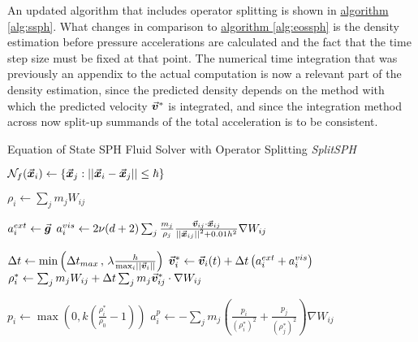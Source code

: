 An updated algorithm that includes operator splitting is shown in \hyperref[alg:ssph]{algorithm \ref{alg:ssph}}. What changes in comparison to \hyperref[alg:eossph]{algorithm \ref{alg:eossph}} is the density estimation before pressure accelerations are calculated and the fact that the time step size must be fixed at that point. The numerical time integration that was previously an appendix to the actual computation is now a relevant part of the density estimation, since the predicted density depends on the method with which the predicted velocity $\vec{\bm{v}}^*$ is integrated, and since the integration method across now split-up summands of the total acceleration is to be consistent.


\begin{algorithm}
  \caption{Equation of State SPH Fluid Solver with Operator Splitting \textit{SplitSPH}}
  \label{alg:ssph}
  \begin{algorithmic}[2]
    \State $\mathcal{N}_f(\vec{\bm{x}}_i) \gets \left\{\vec{\bm{x}}_j: \left|\left|\vec{\bm{x}}_i-\vec{\bm{x}}_j\right|\right|\leq\hbar\right\}$

    \State $\rho_i \gets \sum_j m_j W_{ij}$ 

    \State $a_i^{ext}\gets \vec{\bm{g}}$ 
    \State $a_i^{vis}\gets 2\nu(d+2)\sum_j  \frac{m_j}{\rho_j} \frac{\vec{\bm{v}}_{ij}\cdot\vec{\bm{x}}_{ij}}{\left|\left|\vec{\bm{x}}_{ij}\right|\right|^2 + 0.01h^2}\nabla W_{ij}$ 

    \State $\Delta t \gets \min\left(\Delta t_{max}\,,\,\lambda \frac{h}{\max_i \left|\left|\vec{\bm{v}}_i\right|\right|}
      \right)$ 
    \State $\vec{\bm{v}}_i^* \gets \vec{\bm{v}}_i(t) + \Delta t \left(a_i^{ext} + a_i^{vis}\right)$ 
    \State $\rho_i^* \gets \sum_j m_j W_{ij} + \Delta t \sum_j m_j \vec{\bm{v}}^*_{ij}\cdot\nabla W_{ij}$  

    \State $p_i \gets \max\left(0, k\left(\frac{\rho_i^*}{\rho_0}-1\right)\right)$
    \State $a_i^{p}\gets -\sum_j m_j\left(\frac{p_i}{(\rho_i^*)^2} + \frac{p_j}{(\rho_j^*)^2}\right)\nabla W_{ij}$ 



\end{algorithmic}
\end{algorithm}
